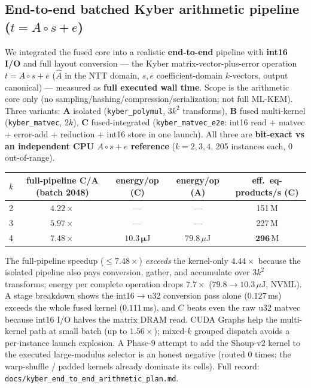 \documentclass[11pt,a4paper]{article}
\begin{document}
\subsection{End-to-end batched Kyber arithmetic pipeline ($t = A\circ s + e$)}
We integrated the fused core into a realistic \textbf{end-to-end} pipeline with \textbf{int16 I/O} and
full layout conversion --- the Kyber matrix-vector-plus-error operation $t = A\circ s + e$ ($\hat A$ in
the NTT domain, $s,e$ coefficient-domain $k$-vectors, output canonical) --- measured as \textbf{full
executed wall time}. Scope is the arithmetic core only (no sampling/hashing/compression/serialization;
not full ML-KEM). Three variants: \textbf{A} isolated (\texttt{kyber\_polymul}, $3k^2$ transforms),
\textbf{B} fused multi-kernel (\texttt{kyber\_matvec}, $2k$), \textbf{C} fused-integrated
(\texttt{kyber\_matvec\_e2e}: int16 read $+$ matvec $+$ error-add $+$ reduction $+$ int16 store in one
launch). All three are \textbf{bit-exact vs an independent CPU $A\circ s+e$ reference} ($k=2,3,4$, 205
instances each, 0 out-of-range).

\begin{center}
\begin{tabular}{lcccc}
\hline
$k$ & full-pipeline C/A (batch 2048) & energy/op (C) & energy/op (A) & eff.\ eq-products/s (C) \\
\hline
2 & $4.22\times$ & --- & --- & 151\,M \\
3 & $5.97\times$ & --- & --- & 227\,M \\
4 & $\mathbf{7.48\times}$ & $\mathbf{10.3\,\mu}$J & $79.8\,\mu$J & $\mathbf{296}$\,M \\
\hline
\end{tabular}
\end{center}

The full-pipeline speedup ($\le 7.48\times$) \emph{exceeds} the kernel-only $4.44\times$ because the
isolated pipeline also pays conversion, gather, and accumulate over $3k^2$ transforms; energy per
complete operation drops $7.7\times$ ($79.8\!\to\!10.3\,\mu$J, NVML). A stage breakdown shows the
int16$\to$u32 conversion pass alone ($0.127$\,ms) exceeds the whole fused kernel ($0.111$\,ms), and $C$
beats even the raw u32 matvec because int16 I/O halves the matrix DRAM read. CUDA Graphs help the
multi-kernel path at small batch (up to $1.56\times$); mixed-$k$ grouped dispatch avoids a per-instance
launch explosion. A Phase-9 attempt to add the Shoup-v2 kernel to the executed large-modulus selector is
an honest negative (routed 0 times; the warp-shuffle / padded kernels already dominate its cells). Full
record: \texttt{docs/kyber\_end\_to\_end\_arithmetic\_plan.md}.
\end{document}
